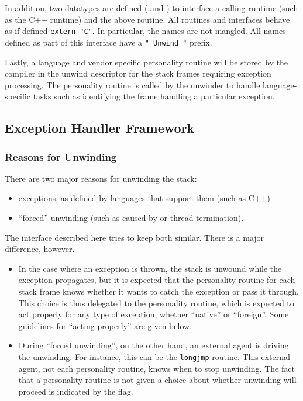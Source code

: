 In addition, two datatypes are defined (
and ) to interface a calling runtime
(such as the C++ runtime) and the above routine. All routines and
interfaces behave as if defined \texttt{extern "C"}. In particular,
the names are not mangled. All names defined as part of this interface
have a \texttt{"\_Unwind\_"} prefix.

Lastly, a language and vendor specific personality routine will be
stored by the compiler in the unwind descriptor for the stack frames
requiring exception processing. The personality routine is called by
the unwinder to handle language-specific tasks such as identifying the
frame handling a particular exception.

\subsection{Exception Handler Framework}

\subsubsection{Reasons for Unwinding}
There are two major reasons for unwinding the stack:
\begin{itemize}
  \item exceptions, as defined by languages that support them (such as C++)
  \item ``forced'' unwinding (such as caused by  or thread
    termination).
\end{itemize}

The interface described here tries to keep both similar. There is a
major difference, however.
\begin{itemize}

\item In the case where an exception is thrown, the stack is unwound
while the exception propagates, but it is expected that the personality
routine for each stack frame knows whether it wants to catch the exception
or pass it through. This choice is thus delegated to the personality
routine, which is expected to act properly for any type of exception,
whether ``native'' or ``foreign''.  Some guidelines for ``acting properly''
are given below.

\item During ``forced unwinding'', on the other hand, an external agent is
driving the unwinding. For instance, this can be the \texttt{longjmp}
routine. This external agent, not each personality routine,
knows when to stop unwinding. The fact that a personality routine is
not given a choice about whether unwinding will proceed is indicated by the
 flag.
\end{itemize}


